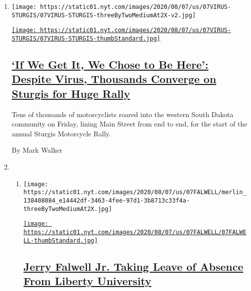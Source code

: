 \begin{enumerate}
\def\labelenumi{\arabic{enumi}.}
\item
  \texttt{[image: https://static01.nyt.com/images/2020/08/07/us/07VIRUS-STURGIS/07VIRUS-STURGIS-threeByTwoMediumAt2X-v2.jpg]}

  \href{/2020/08/07/us/sturgis-motorcyle-rally.html}{\texttt{[image: https://static01.nyt.com/images/2020/08/07/us/07VIRUS-STURGIS/07VIRUS-STURGIS-thumbStandard.jpg]}}

  \hypertarget{if-we-get-it-we-chose-to-be-here-despite-virus-thousands-converge-on-sturgis-for-huge-rally}{%
  \subsection{\texorpdfstring{\href{/2020/08/07/us/sturgis-motorcyle-rally.html}{`If
  We Get It, We Chose to Be Here': Despite Virus, Thousands Converge on
  Sturgis for Huge
  Rally}}{`If We Get It, We Chose to Be Here': Despite Virus, Thousands Converge on Sturgis for Huge Rally}}\label{if-we-get-it-we-chose-to-be-here-despite-virus-thousands-converge-on-sturgis-for-huge-rally}}

  Tens of thousands of motorcyclists roared into the western South
  Dakota community on Friday, lining Main Street from end to end, for
  the start of the annual Sturgis Motorcycle Rally.

  By Mark Walker
\item
  \begin{enumerate}
  \def\labelenumii{\arabic{enumii}.}
  \item
    \texttt{[image: https://static01.nyt.com/images/2020/08/07/us/07FALWELL/merlin\_138408084\_e14442df-3463-4fee-97d1-3b8713c33f4a-threeByTwoMediumAt2X.jpg]}

    \href{/2020/08/07/us/falwell-liberty.html}{\texttt{[image: https://static01.nyt.com/images/2020/08/07/us/07FALWELL/07FALWELL-thumbStandard.jpg]}}

    \hypertarget{jerry-falwell-jr-taking-leave-of-absence-from-liberty-university}{%
    \subsection{\texorpdfstring{\href{/2020/08/07/us/falwell-liberty.html}{Jerry
    Falwell Jr. Taking Leave of Absence From Liberty
    University}}{Jerry Falwell Jr. Taking Leave of Absence From Liberty University}}\label{jerry-falwell-jr-taking-leave-of-absence-from-liberty-university}}


\end{enumerate}
\end{enumerate}
